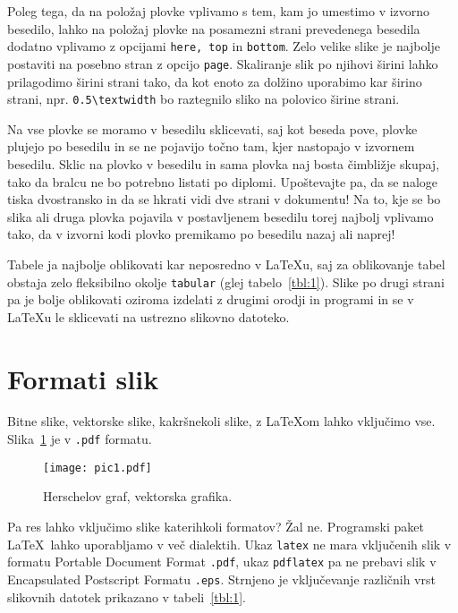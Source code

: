 \documentclass{feridiploma}
\begin{document}
	Poleg tega, da na položaj plovke vplivamo s tem, kam jo umestimo v izvorno besedilo, lahko na položaj plovke na posamezni strani prevedenega besedila dodatno vplivamo z opcijami \texttt{here, top} in \texttt{bottom}.
	Zelo velike slike je najbolje postaviti na posebno stran z opcijo \texttt{page}.
	Skaliranje slik po njihovi širini lahko prilagodimo širini strani tako, da kot enoto za dolžino uporabimo kar širino strani, npr. \verb=0.5\textwidth= bo raztegnilo sliko na polovico širine strani.
	
	Na vse plovke se moramo v besedilu sklicevati, saj kot beseda pove, plovke plujejo po besedilu in se ne pojavijo točno tam, kjer nastopajo v izvornem besedilu.
	Sklic na plovko v besedilu in sama plovka naj bosta čimbližje skupaj, tako da bralcu ne bo potrebno listati po diplomi. 
	Upoštevajte pa, da se naloge tiska dvostransko in da se hkrati vidi dve strani v dokumentu!
	Na to, kje se bo slika ali druga plovka pojavila v postavljenem besedilu torej najbolj vplivamo tako, da v izvorni kodi plovko premikamo po besedilu nazaj ali naprej!
	
	Tabele ja najbolje oblikovati kar neposredno v \LaTeX u, saj za oblikovanje tabel obstaja zelo fleksibilno okolje \texttt{tabular} (glej tabelo~\ref{tbl:1}).
	Slike po drugi strani pa je bolje oblikovati oziroma izdelati z drugimi orodji in programi in se v \LaTeX u le sklicevati na ustrezno slikovno datoteko.
	
	\section{Formati slik}
	
	Bitne slike, vektorske slike, kakršnekoli slike, z \LaTeX{}om lahko vključimo vse.
	Slika~\ref{pic1} je v {\tt .pdf} formatu.
	\begin{figure}[h]
	\begin{center}
	\texttt{[image: pic1.pdf]}
	\end{center}
	\caption{Herschelov graf, vektorska grafika.}
	\label{pic1}
	\end{figure}
	Pa res lahko vključimo slike katerihkoli formatov? 
	Žal ne. 
	Programski paket \LaTeX\ lahko uporabljamo v več dialektih. 
	Ukaz {\tt latex} ne mara vključenih slik v formatu Portable Document Format {\tt .pdf}, ukaz {\tt pdflatex} pa ne prebavi slik v Encapsulated Postscript Formatu {\tt .eps}.
	Strnjeno je vključevanje različnih vrst slikovnih datotek prikazano v tabeli~\ref{tbl:1}.
	
\end{document}
